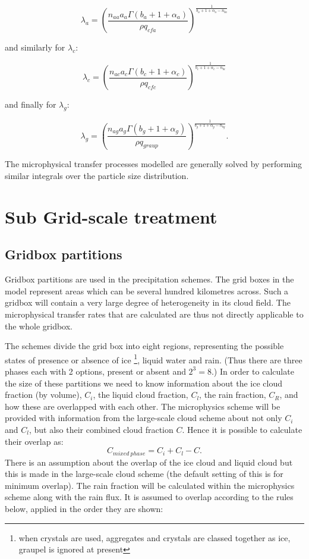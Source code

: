 \documentclass{UMDP_article}
\def\bq{\begin{equation}}
\def\eq{\end{equation}}
\begin{document}
\bq
\lambda_a = 
{ \left( \frac {n_{aa} a_a \Gamma(b_a + 1 + \alpha_a) } { \rho q_{cfa} } \right) }
^{ \frac{1}{b_a+1+\alpha_a-n_{ba}} } 
\eq

and similarly for $\lambda_c$:

\bq
\lambda_c = 
{ \left( \frac {n_{ac} a_c \Gamma(b_c+1+\alpha_c) } { \rho q_{cfc} } \right) }
^{ \frac{1}{b_c+1+\alpha_c-n_{bc}} } 
\eq

and finally for $\lambda_g$:

\bq
\lambda_g =
{ \left( \frac {n_{ag} a_g \Gamma(b_g+1+\alpha_g) } { \rho q_{graup} } \right) }
^{ \frac{1}{b_g+1+\alpha_g-n_{bg}} } . 
\eq

The microphysical transfer processes modelled are generally solved by performing 
similar integrals over the particle size distribution.

\newpage
\section{Sub Grid-scale treatment}
\label{sec:subgrid}
\subsection{Gridbox partitions}

Gridbox partitions are used in the precipitation schemes. 
The grid boxes in the model
represent areas which can be several hundred kilometres across. Such a gridbox 
will contain a very large degree of heterogeneity in its cloud field. The 
microphysical transfer rates that are calculated are thus not directly applicable 
to the whole gridbox.

The schemes divide the grid box into eight regions, 
representing the possible states of presence or absence of ice 
\footnote{when crystals are used, aggregates and crystals are classed 
together as ice, graupel is ignored at present}, liquid water and rain. 
(Thus there are three phases each with
2 options, present or absent and $2^3=8$.)
In order to calculate the size of these partitions we need to know information 
about the ice cloud fraction (by volume), $C_i$, the liquid cloud fraction, 
$C_l$, the rain fraction, $C_R$, and how these are overlapped with each other.
The microphysics scheme will be provided with information from the large-scale
cloud scheme about not only $C_i$ and $C_l$, but also their combined cloud 
fraction $C$. Hence it is possible to calculate their overlap as:
\bq
C_{mixed~phase} = C_i + C_l - C .
\eq
There is an assumption about the overlap of the ice cloud and liquid cloud 
but this is made in the large-scale cloud scheme (the default setting of this 
is for minimum overlap). The rain fraction will be calculated within the 
microphysics scheme along with the rain flux. It is assumed to overlap 
according to the rules below, applied in the order they are shown:
\end{document}
